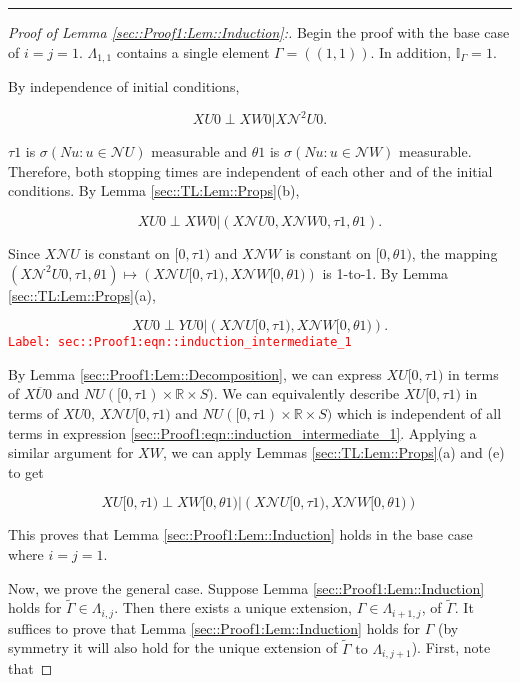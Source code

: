 \documentclass[12pt]{article}
\newcommand{\mb}{\mathbb}
\newcommand{\mc}{\mathcal}
\newcommand{\ov}{\overline}
\newcommand{\te}{\text}
\newcommand{\tr}{\textcolor{red}}
\newcommand{\labe}[1]{\tr{\texttt{Label: #1}}}
\newcommand{\ind}{\hspace{24pt}}
\newcommand{\lin}{\rule{\linewidth}{0.4 pt}}
\newcommand{\vv}{u}								%
\renewcommand{\U}{U}							%
\newcommand{\UU}{W}								%
\renewcommand{\S}{S}							%
\newcommand{\X}{X}								%
\newcommand{\neigh}{\mc{N}}						%
\newcommand{\dneigh}{\mc{N}^2}					%
\newcommand{\cl}{\ov}							%
\newcommand{\poiss}{N}							%
\newcommand{\alt}[1]{\widetilde{#1}}			%
\newcommand{\XX}{Y}								%
\newcommand{\rt}{\tau}							%
\newcommand{\rtt}{\theta}						%
\newcommand{\apath}{\Gamma}						%
\newcommand{\pathset}[2]{\Lambda_{#1,#2}}		%
\begin{document}
\lin

\begin{proof}[Proof of Lemma \ref{sec::Proof1:Lem::Induction}:]
Begin the proof with the base case of \(i=j =1\). \(\pathset{1}{1}\) contains a single element \(\apath = ((1,1))\). In addition, \(\mb{I}_{\apath} = 1\).

By independence of initial conditions,

\[\X{\U}{0}\perp \X{\UU}{0}|\X{\dneigh{\U}}{0}.\]

\(\rt{1}\) is \(\sigma\left(\poiss{\vv}:\vv\in \neigh{\U}\right)\) measurable and \(\rtt{1}\) is \(\sigma\left(\poiss{\vv}:\vv\in \neigh{\UU}\right)\) measurable. Therefore, both stopping times are independent of each other and of the initial conditions. By Lemma \ref{sec::TL:Lem::Props}(b), 

\[\X{\U}{0}\perp \X{\UU}{0}|\left(\X{\neigh{\U}}{0},\X{\neigh{\UU}}{0},\rt{1},\rtt{1}\right).\]

Since \(\X{\neigh{\U}}{}\) is constant on \([0,\rt{1})\) and \(\X{\neigh{\UU}}{}\) is constant on \([0,\rtt{1})\), the mapping \((\X{\dneigh{\U}}{0},\rt{1},\rtt{1}) \mapsto (\X{\neigh{\U}}{[0,\rt{1})},\X{\neigh{\UU}}{[0,\rtt{1})})\) is 1-to-1. By Lemma \ref{sec::TL:Lem::Props}(a),

\begin{equation}
\X{\U}{0}\perp \XX{\U}{0}|\left(\X{\neigh{\U}}{[0,\rt{1})},\X{\neigh{\UU}}{[0,\rtt{1})}\right).
\label{sec::Proof1:eqn::induction_intermediate_1}
\end{equation}
\labe{sec::Proof1:eqn::induction\_intermediate\_1}

By Lemma \ref{sec::Proof1:Lem::Decomposition}, we can express \(\X{\U}{[0,\rt{1})}\) in terms of \(\X{\cl{\U}}{0}\) and \(\poiss{\U}([0,\rt{1})\times\mb{R}\times\S)\). We can equivalently describe \(\X{\U}{[0,\rt{1})}\) in terms of \(\X{\U}{0}\), \(\X{\neigh{\U}}{[0,\rt{1})}\) and \(\poiss{\U}([0,\rt{1})\times \mb{R}\times \S)\) which is independent of all terms in expression \eqref{sec::Proof1:eqn::induction_intermediate_1}. Applying a similar argument for \(\X{\UU}{}\), we can apply Lemmas \ref{sec::TL:Lem::Props}(a) and (e) to get

\[\X{\U}{[0,\rt{1})}\perp \X{\UU}{[0,\rtt{1})}|\left(\X{\neigh{\U}}{[0,\rt{1})},\X{\neigh{\UU}}{[0,\rtt{1})}\right)\]

This proves that Lemma \ref{sec::Proof1:Lem::Induction} holds in the base case where \(i = j = 1\).

\ind Now, we prove the general case. Suppose Lemma \ref{sec::Proof1:Lem::Induction} holds for \(\alt{\apath} \in \pathset{i}{j}\). Then there exists a unique extension, \(\apath \in \pathset{i+1}{j}\), of \(\alt{\apath}\). It suffices to prove that Lemma \ref{sec::Proof1:Lem::Induction} holds for \(\apath\) (by symmetry it will also hold for the unique extension of \(\alt{\apath} \te{ to } \pathset{i}{j+1}\)). First, note that


\end{proof}
\end{document}
